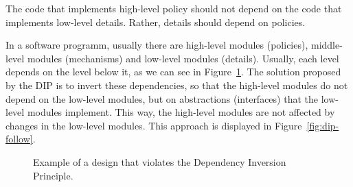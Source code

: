 \begin{principio}
    The code that implements high-level policy should not depend on the code that implements low-level details. Rather, details should depend on policies.
\end{principio}

In a software programm, usually there are high-level modules (policies), middle-level modules (mechanisms) and low-level modules (details). Usually, each level depends on the level below it, as we can see in Figure~\ref{fig:dip-violation}. The solution proposed by the DIP is to invert these dependencies, so that the high-level modules do not depend on the low-level modules, but on abstractions (interfaces) that the low-level modules implement. This way, the high-level modules are not affected by changes in the low-level modules. This approach is displayed in Figure~\ref{fig:dip-follow}.
\begin{figure}
    \centering
    \caption{Example of a design that violates the Dependency Inversion Principle.}
    \label{fig:dip-violation}
\end{figure}
